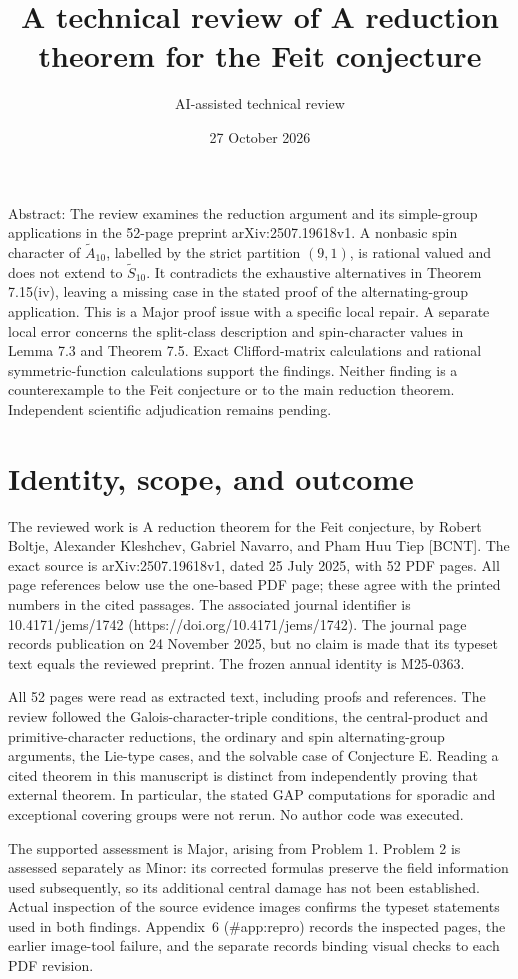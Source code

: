\documentclass[10pt]{article}
\title{A technical review of
A reduction theorem for the Feit conjecture}
\author{AI-assisted technical review}
\date{27 October 2026}
\begin{document}
\maketitle
Abstract: The review examines the reduction argument and its simple-group applications in the 52-page preprint arXiv:2507.19618v1. A nonbasic spin character of \(\widetilde A_{10}\), labelled by the strict partition \((9,1)\), is rational valued and does not extend to \(\widetilde S_{10}\). It contradicts the exhaustive alternatives in Theorem 7.15(iv), leaving a missing case in the stated proof of the alternating-group application. This is a Major proof issue with a specific local repair. A separate local error concerns the split-class description and spin-character values in Lemma 7.3 and Theorem 7.5. Exact Clifford-matrix calculations and rational symmetric-function calculations support the findings. Neither finding is a counterexample to the Feit conjecture or to the main reduction theorem. Independent scientific adjudication remains pending.\par
\section*{Identity, scope, and outcome}
The reviewed work is A reduction theorem for the Feit conjecture, by Robert Boltje, Alexander Kleshchev, Gabriel Navarro, and Pham Huu Tiep [BCNT]. The exact source is arXiv:2507.19618v1, dated 25 July 2025, with 52 PDF pages. All page references below use the one-based PDF page; these agree with the printed numbers in the cited passages. The associated journal identifier is 10.4171/jems/1742 (https://doi.org/10.4171/jems/1742). The journal page records publication on 24 November 2025, but no claim is made that its typeset text equals the reviewed preprint. The frozen annual identity is M25-0363.\par
All 52 pages were read as extracted text, including proofs and references. The review followed the Galois-character-triple conditions, the central-product and primitive-character reductions, the ordinary and spin alternating-group arguments, the Lie-type cases, and the solvable case of Conjecture E. Reading a cited theorem in this manuscript is distinct from independently proving that external theorem. In particular, the stated GAP computations for sporadic and exceptional covering groups were not rerun. No author code was executed.\par
The supported assessment is Major, arising from Problem 1. Problem 2 is assessed separately as Minor: its corrected formulas preserve the field information used subsequently, so its additional central damage has not been established. Actual inspection of the source evidence images confirms the typeset statements used in both findings. Appendix 6 (\#app:repro) records the inspected pages, the earlier image-tool failure, and the separate records binding visual checks to each PDF revision.\par
\end{document}
